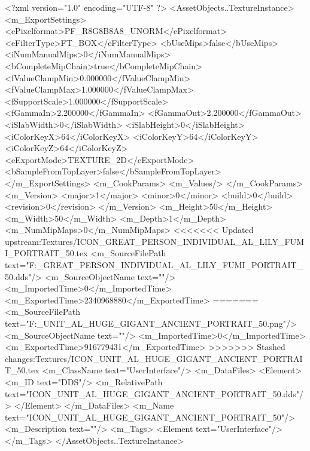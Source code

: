 <?xml version="1.0" encoding="UTF-8" ?>
<AssetObjects..TextureInstance>
	<m_ExportSettings>
		<ePixelformat>PF_R8G8B8A8_UNORM</ePixelformat>
		<eFilterType>FT_BOX</eFilterType>
		<bUseMips>false</bUseMips>
		<iNumManualMips>0</iNumManualMips>
		<bCompleteMipChain>true</bCompleteMipChain>
		<fValueClampMin>0.000000</fValueClampMin>
		<fValueClampMax>1.000000</fValueClampMax>
		<fSupportScale>1.000000</fSupportScale>
		<fGammaIn>2.200000</fGammaIn>
		<fGammaOut>2.200000</fGammaOut>
		<iSlabWidth>0</iSlabWidth>
		<iSlabHeight>0</iSlabHeight>
		<iColorKeyX>64</iColorKeyX>
		<iColorKeyY>64</iColorKeyY>
		<iColorKeyZ>64</iColorKeyZ>
		<eExportMode>TEXTURE_2D</eExportMode>
		<bSampleFromTopLayer>false</bSampleFromTopLayer>
	</m_ExportSettings>
	<m_CookParams>
		<m_Values/>
	</m_CookParams>
	<m_Version>
		<major>1</major>
		<minor>0</minor>
		<build>0</build>
		<revision>0</revision>
	</m_Version>
	<m_Height>50</m_Height>
	<m_Width>50</m_Width>
	<m_Depth>1</m_Depth>
	<m_NumMipMaps>0</m_NumMipMaps>
<<<<<<< Updated upstream:Textures/ICON_GREAT_PERSON_INDIVIDUAL_AL_LILY_FUMI_PORTRAIT_50.tex
	<m_SourceFilePath text="F:\DT\lilyimages\gpportrait\ICON_GREAT_PERSON_INDIVIDUAL_AL_LILY_FUMI_PORTRAIT_50.dds"/>
	<m_SourceObjectName text=""/>
	<m_ImportedTime>0</m_ImportedTime>
	<m_ExportedTime>2340968880</m_ExportedTime>
=======
	<m_SourceFilePath text="F:\DT\lilyimages\all\ICON_UNIT_AL_HUGE_GIGANT_ANCIENT_PORTRAIT_50.png"/>
	<m_SourceObjectName text=""/>
	<m_ImportedTime>0</m_ImportedTime>
	<m_ExportedTime>916779431</m_ExportedTime>
>>>>>>> Stashed changes:Textures/ICON_UNIT_AL_HUGE_GIGANT_ANCIENT_PORTRAIT_50.tex
	<m_ClassName text="UserInterface"/>
	<m_DataFiles>
		<Element>
			<m_ID text="DDS"/>
			<m_RelativePath text="ICON_UNIT_AL_HUGE_GIGANT_ANCIENT_PORTRAIT_50.dds"/>
		</Element>
	</m_DataFiles>
	<m_Name text="ICON_UNIT_AL_HUGE_GIGANT_ANCIENT_PORTRAIT_50"/>
	<m_Description text=""/>
	<m_Tags>
		<Element text="UserInterface"/>
	</m_Tags>
</AssetObjects..TextureInstance>


